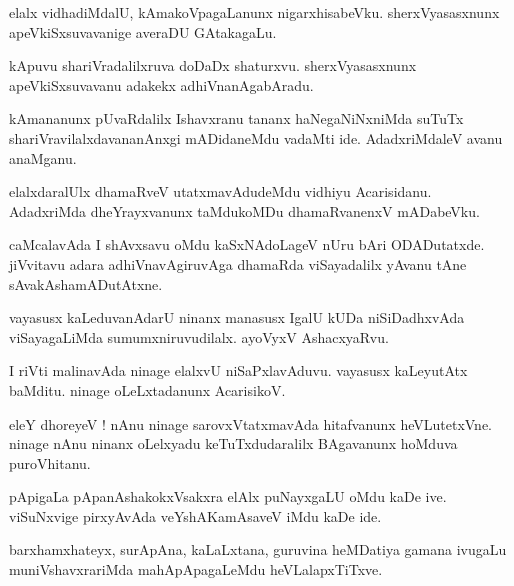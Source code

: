 \documentclass{article}
\begin{document}
\begin{mn}%
elalx vidhadiMdalU, kAmakoVpagaLanunx nigarxhisabeVku. sherxVyasasxnunx apeVkiSxsuvavanige 
averaDU GAtakagaLu.
\end{mn}

\begin{mn}%
kApuvu shariVradalilxruva doDaDx shaturxvu. sherxVyasasxnunx apeVkiSxsuvavanu adakekx 
adhiVnanAgabAradu.
\end{mn}

\begin{mn}%
kAmananunx pUvaRdalilx Ishavxranu tananx haNegaNiNxniMda suTuTx shariVravilalxdavananAnxgi 
mADidaneMdu vadaMti ide. AdadxriMdaleV avanu anaMganu.
\end{mn}

\begin{mn}%
elalxdaralUlx dhamaRveV utatxmavAdudeMdu vidhiyu Acarisidanu. AdadxriMda dheYrayxvanunx 
taMdukoMDu dhamaRvanenxV mADabeVku.
\end{mn}

\begin{mn}%
caMcalavAda I shAvxsavu oMdu kaSxNAdoLageV nUru bAri ODADutatxde. jiVvitavu adara 
adhiVnavAgiruvAga dhamaRda viSayadalilx yAvanu tAne sAvakAshamADutAtxne.
\end{mn}

\begin{mn}%
vayasusx kaLeduvanAdarU ninanx manasusx IgalU kUDa niSiDadhxvAda viSayagaLiMda 
sumumxniruvudilalx. ayoVyxV AshacxyaRvu.
\end{mn}

\begin{mn}%
I riVti malinavAda ninage elalxvU niSaPxlavAduvu. vayasusx kaLeyutAtx baMditu. ninage 
oLeLxtadanunx AcarisikoV.
\end{mn}

\begin{mn}%
eleY dhoreyeV ! nAnu ninage sarovxVtatxmavAda hitafvanunx heVLutetxVne. ninage nAnu ninanx 
oLelxyadu keTuTxdudaralilx BAgavanunx hoMduva puroVhitanu.
\end{mn}

\begin{mn}%
pApigaLa pApanAshakokxVsakxra elAlx puNayxgaLU oMdu kaDe ive. viSuNxvige pirxyAvAda 
veYshAKamAsaveV iMdu kaDe  ide.
\end{mn}

\begin{mn}%
barxhamxhateyx, surApAna, kaLaLxtana, guruvina heMDatiya gamana ivugaLu muniVshavxrariMda 
mahApApagaLeMdu  heVLalapxTiTxve.
\end{mn}
\end{document}
